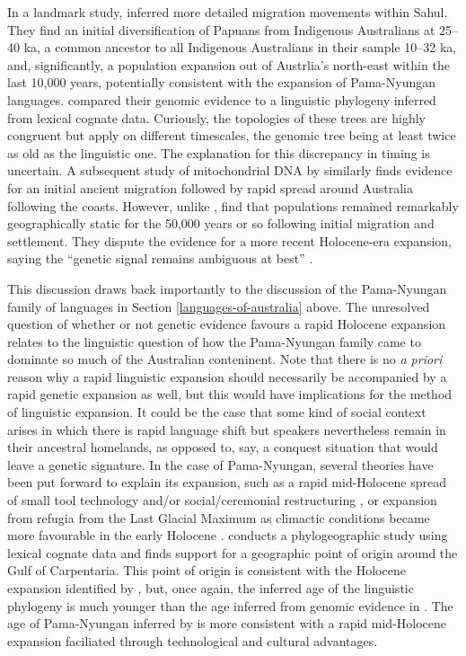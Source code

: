 In a landmark study, \textcite{malaspinas_genomic_2016} inferred more detailed migration movements within Sahul. They find an initial diversification of Papuans from Indigenous Australians at 25--40 ka, a common ancestor to all Indigenous Australians in their sample 10--32 ka, and, significantly, a population expansion out of Austrlia's north-east within the last 10,000 years, potentially consistent with the expansion of Pama-Nyungan languages. \textcite{malaspinas_genomic_2016} compared their genomic evidence to a linguistic phylogeny inferred from lexical cognate data. Curiously, the topologies of these trees are highly congruent but apply on different timescales, the genomic tree being at least twice as old as the linguistic one. The explanation for this discrepancy in timing is uncertain. A subsequent study of mitochondrial DNA by \textcite{tobler_aboriginal_2017} similarly finds evidence for an initial ancient migration followed by rapid spread around Australia following the coasts. However, unlike \textcite{malaspinas_genomic_2016}, \textcite{tobler_aboriginal_2017} find that populations remained remarkably geographically static for the 50,000 years or so following initial migration and settlement. They dispute the evidence for a more recent Holocene-era expansion, saying the ``genetic signal remains ambiguous at best'' \autocite[p.~183]{tobler_aboriginal_2017}.

This discussion draws back importantly to the discussion of the Pama-Nyungan family of languages in Section \ref{languages-of-australia} above. The unresolved question of whether or not genetic evidence favours a rapid Holocene expansion relates to the linguistic question of how the Pama-Nyungan family came to dominate so much of the Australian conteninent. Note that there is no \emph{a priori} reason why a rapid linguistic expansion should necessarily be accompanied by a rapid genetic expansion as well, but this would have implications for the method of linguistic expansion. It could be the case that some kind of social context arises in which there is rapid language shift but speakers nevertheless remain in their ancestral homelands, as opposed to, say, a conquest situation that would leave a genetic signature. In the case of Pama-Nyungan, several theories have been put forward to explain its expansion, such as a rapid mid-Holocene spread of small tool technology and/or social/ceremonial restructuring \autocite{evans_enigma_1998}, or expansion from refugia from the Last Glacial Maximum as climactic conditions became more favourable in the early Holocene \autocite{bouckaert_origin_2018}. \textcite{bouckaert_origin_2018} conducts a phylogeographic study using lexical cognate data and finds support for a geographic point of origin around the Gulf of Carpentaria. This point of origin is consistent with the Holocene expansion identified by \textcite{malaspinas_genomic_2016}, but, once again, the inferred age of the linguistic phylogeny is much younger than the age inferred from genomic evidence in \textcite{malaspinas_genomic_2016}. The age of Pama-Nyungan inferred by \textcite{bouckaert_origin_2018} is more consistent with a rapid mid-Holocene expansion faciliated through technological and cultural advantages.

